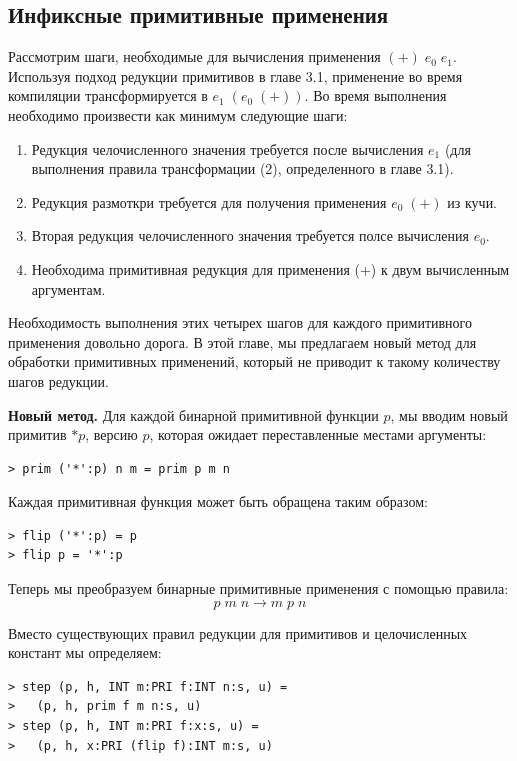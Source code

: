 \documentclass[flenqn, 14pt]{extarticle}
\begin{document}
\subsection{Инфиксные примитивные применения}
Рассмотрим шаги, необходимые для вычисления применения $(+) \; e_0 \; e_1$.  Используя подход редукции примитивов в главе 3.1, применение во время компиляции трансформируется в $e_1 \; (e_0 \; (+))$. Во время выполнения необходимо произвести как минимум следующие шаги:
\begin{enumerate}
\item Редукция челочисленного значения требуется после вычисления $e_1$ (для выполнения правила трансформации (2), определенного в главе 3.1).
\item Редукция размоткри требуется для получения применения $e_0 \; (+)$ из кучи.
\item Вторая редукция челочисленного значения требуется полсе вычисления $e_0$.
\item Необходима примитивная редукция для применения (+) к двум вычисленным аргументам.
\end{enumerate}

Необходимость выполнения этих четырех шагов для каждого примитивного применения довольно дорога. В этой главе, мы предлагаем новый метод для обработки примитивных применений, который не приводит к такому количеству шагов редукции.

\textbf{Новый метод.} Для каждой бинарной примитивной функции $p$, мы вводим новый примитив $*p$, версию $p$, которая ожидает переставленные местами аргументы:
\begin{verbatim}
> prim ('*':p) n m = prim p m n
\end{verbatim}

Каждая примитивная функция может быть обращена таким образом:
\begin{verbatim}
> flip ('*':p) = p
> flip p = '*':p
\end{verbatim}

Теперь мы преобразуем бинарные примитивные применения с помощью правила:
\begin{equation}\label{eq:rule_optimised_prim}
p \; m \; n \rightarrow m \; p \; n
\end{equation}

Вместо существующих правил редукции для примитивов и целочисленных констант мы определяем:
\begin{verbatim}
> step (p, h, INT m:PRI f:INT n:s, u) = 
>   (p, h, prim f m n:s, u)
> step (p, h, INT m:PRI f:x:s, u) =
>   (p, h, x:PRI (flip f):INT m:s, u)
\end{verbatim}
\end{document}
